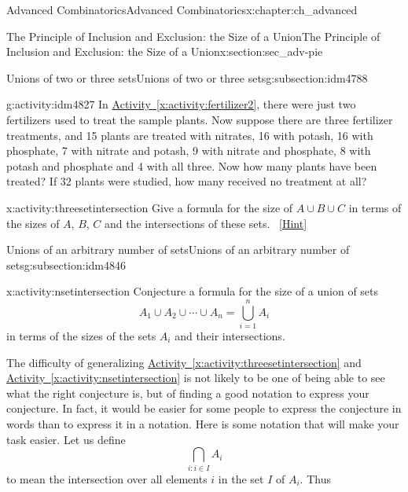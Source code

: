 \documentclass[oneside,10pt,]{book}
\numberwithin{equation}{chapter}
\begin{document}
\begin{chapterptx}{Advanced Combinatorics}{}{Advanced Combinatorics}{}{}{x:chapter:ch_advanced}
\begin{sectionptx}{The Principle of Inclusion and Exclusion: the Size of a Union}{}{The Principle of Inclusion and Exclusion: the Size of a Union}{}{}{x:section:sec_adv-pie}
\begin{subsectionptx}{Unions of two or three sets}{}{Unions of two or three sets}{}{}{g:subsection:idm4788}
\begin{activity}{}{g:activity:idm4827}%
In \hyperref[x:activity:fertilizer2]{Activity~\ref{x:activity:fertilizer2}}, there were just two fertilizers used to treat the sample plants. Now suppose there are three fertilizer treatments, and 15 plants are treated with nitrates, 16 with potash, 16 with phosphate, 7 with nitrate and potash, 9 with nitrate and phosphate, 8 with potash and phosphate and 4 with all three. Now how many plants have been treated? If 32 plants were studied, how many received no treatment at all?%
\end{activity}
\begin{activity}{}{x:activity:threesetintersection}%
Give a formula for the size of \(A\cup B\cup C\) in terms of the sizes of \(A\), \(B\), \(C\) and the intersections of these sets.%
\qquad~\hfill{\tiny\hyperlink{g:hint:idm4841-back}{[Hint]}}\end{activity}
\end{subsectionptx}
%
%
\typeout{************************************************}
\typeout{************************************************}
%
\begin{subsectionptx}{Unions of an arbitrary number of sets}{}{Unions of an arbitrary number of sets}{}{}{g:subsection:idm4846}
\begin{activity}{}{x:activity:nsetintersection}%
Conjecture a formula for the size of a union of sets%
\begin{equation*}
A_1\cup
A_2\cup \cdots\cup A_n = \bigcup_{i=1}^n A_i
\end{equation*}
in terms of the sizes of the sets \(A_i\) and their intersections.%
\end{activity}
The difficulty of generalizing \hyperref[x:activity:threesetintersection]{Activity~\ref{x:activity:threesetintersection}} and \hyperref[x:activity:nsetintersection]{Activity~\ref{x:activity:nsetintersection}} is not likely to be one of being able to see what the right conjecture is, but of finding a good notation to express your conjecture. In fact, it would be easier for some people to express the conjecture in words than to express it in a notation. Here is some notation that will make your task easier. Let us define%
\begin{equation*}
\bigcap_{i:i\in I}A_i
\end{equation*}
to mean the intersection over all elements \(i\) in the set \(I\) of \(A_i\). Thus%
\begin{equation}

\end{equation}
\end{subsectionptx}
\end{sectionptx}
\end{chapterptx}
\end{document}
